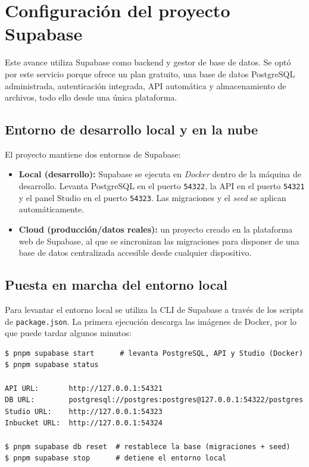 
\section{Configuraci\'on del proyecto Supabase}

Este avance utiliza Supabase como backend y gestor de base de datos. Se
opt\'o por este servicio porque ofrece un plan gratuito, una base de
datos PostgreSQL administrada, autenticaci\'on integrada, API autom\'atica
y almacenamiento de archivos, todo ello desde una \'unica plataforma.

\subsection{Entorno de desarrollo local y en la nube}

El proyecto mantiene dos entornos de Supabase:

\begin{itemize}
  \item \textbf{Local (desarrollo):} Supabase se ejecuta en
    \textit{Docker} dentro de la m\'aquina de desarrollo. Levanta
    PostgreSQL en el puerto \texttt{54322}, la API en el puerto
    \texttt{54321} y el panel Studio en el puerto \texttt{54323}.
    Las migraciones y el \textit{seed} se aplican autom\'aticamente.

  \item \textbf{Cloud (producci\'on/datos reales):} un proyecto creado
    en la plataforma web de Supabase, al que se sincronizan las
    migraciones para disponer de una base de datos centralizada
    accesible desde cualquier dispositivo.
\end{itemize}

\subsection{Puesta en marcha del entorno local}

Para levantar el entorno local se utiliza la CLI de Supabase a trav\'es
de los scripts de \texttt{package.json}. La primera ejecuci\'on descarga
las im\'agenes de Docker, por lo que puede tardar algunos minutos:

\begin{lstlisting}[style=terminal]
$ pnpm supabase start      # levanta PostgreSQL, API y Studio (Docker)
$ pnpm supabase status

API URL:       http://127.0.0.1:54321
DB URL:        postgresql://postgres:postgres@127.0.0.1:54322/postgres
Studio URL:    http://127.0.0.1:54323
Inbucket URL:  http://127.0.0.1:54324

$ pnpm supabase db reset  # restablece la base (migraciones + seed)
$ pnpm supabase stop      # detiene el entorno local
\end{lstlisting}

